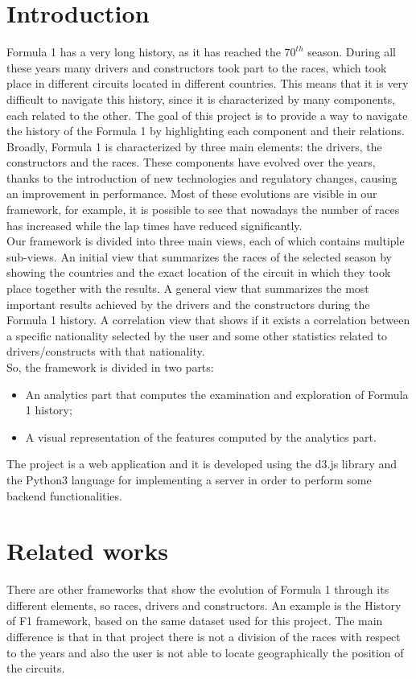\documentclass[11pt,twocolumn,letterpaper]{article}
\begin{document}
\section{Introduction}
Formula 1 has a very long history, as it has reached the $70^{th}$ season. During all these years many drivers and constructors took part to the races, which took place in different circuits located in different countries. This means that it is very difficult to navigate this history, since it is characterized by many components, each related to the other. The goal of this project is to provide a way to navigate the history of the Formula 1 by highlighting each component and their relations. Broadly, Formula 1 is characterized by three main elements: the drivers, the constructors and the races. These components have evolved over the years, thanks to the introduction of new technologies and regulatory changes, causing an improvement in performance. Most of these evolutions are visible in our framework, for example, it is possible to see that nowadays the number of races has increased while the lap times have reduced significantly.\\
Our framework is divided into three main views, each of which contains multiple sub-views. An initial view that summarizes the races of the selected season by showing the countries and the exact location of the circuit in which they took place together with the results. A general view that summarizes the most important results achieved by the drivers and the constructors during the Formula 1 history. A correlation view that shows if it exists a correlation between a specific nationality selected by the user and some other statistics related to drivers/constructs with that nationality. \\
So, the framework is divided in two parts:
\begin{itemize}
	\item An analytics part that computes the examination and exploration of Formula 1 history;
	\item A visual representation of the features computed by the analytics part.
\end{itemize}
The project is a web application and it is developed using the d3.js \cite{D3} library and the Python3 language for implementing a server in order to perform some backend functionalities.

\section{Related works}
There are other frameworks that show the evolution of Formula 1 through its different elements, so races, drivers and constructors. An example is the History of F1 \cite{HistoryOfF1} framework, based on the same dataset used for this project. The main difference is that in that project there is not a division of the races with respect to the years and also the user is not able to locate geographically the position of the circuits. 
\end{document}

